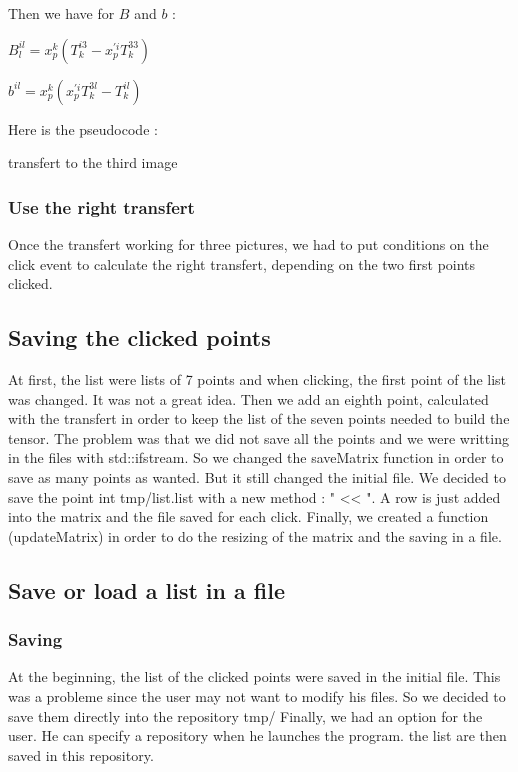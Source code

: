 \documentclass{report}
\begin{document}
Then we have for $B$ and $b$ :  
\begin{center}
$B_{l}^{il} = x_{p}^{k}(T_{k}^{i3} - x_{p}^{'i}T_{k}^{33})$
\end{center}
\begin{center}
$b^{il} = x_{p}^{k}(x_{p}^{'i}T_{k}^{3l} - T_{k}^{il})$
\end{center}

Here is the pseudocode : 
\begin{algorithm}
\SetLine
\caption{transfert to the third image}
\SetLine
{}
\end{algorithm}
\subsubsection{Use the right transfert}
Once the transfert working for three pictures, we had to put conditions on the click event to calculate the right transfert, depending on the two first points clicked.  

 
\subsection{Saving the clicked points}
At first, the list were lists of 7 points and when clicking, the first point of the list was changed. It was not a great idea. 
Then we add an eighth point, calculated with the transfert in order to keep the list of the seven points needed to build the tensor. The problem was that we did not save all the points and we were writting in the files with std::ifstream. So we changed the saveMatrix function in order to save as many points as wanted. But it still changed the initial file. 
We decided to save the point int tmp/list.list with a new method : " << ". A row is just added into the matrix and the file saved for each click. 
Finally, we created a function (updateMatrix) in order to do the resizing of the matrix and the saving in a file. 

\subsection{Save or load a list in a file}
\subsubsection{Saving}
At the beginning, the list of the clicked points were saved in the initial file. This was a probleme since the user may not want to modify his files. 
So we decided to save them directly into the repository tmp/ 
Finally, we had an option for the user. He can specify a repository when he launches the program. the list are then saved in this repository. 
\end{document}

